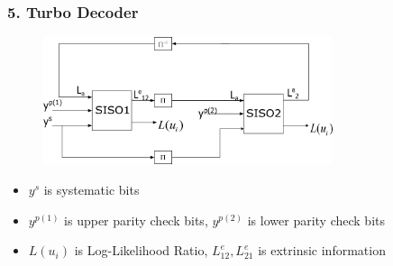 \documentclass{beamer}  %
\begin{document}
\begin{frame}
\frametitle{5. Turbo Decoder}

\begin{figure}
\centering
		\includegraphics[width=8.5cm]{D1.eps}
	\end{figure}
\begin{itemize}
\item $y^s$ is systematic bits

\item $y^{p(1)}$ is upper parity check bits,  $y^{p(2)}$ is lower parity check bits


\item $L(u_i)$ is Log-Likelihood Ratio, $L^e_{12}, L^e_{21}$ is extrinsic information

\end{itemize}

\end{frame}
\end{document}
